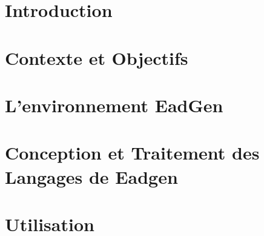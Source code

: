 \documentclass[twocolumn]{article}
\begin{document}
\section{Introduction}


\section{Contexte et Objectifs}


\section{L’environnement EadGen}


\section{Conception et Traitement des Langages de Eadgen}


\section{Utilisation}

\end{document}
